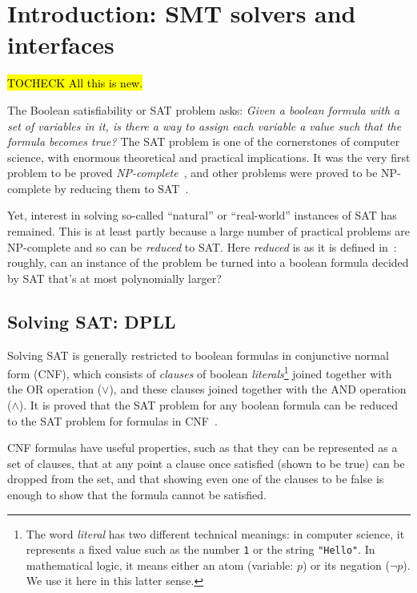 \chapter{Introduction: SMT solvers and interfaces}
\label{chap:intro}

\hl{TOCHECK All this is new.}

The Boolean satisfiability or SAT problem asks: \textit{Given a boolean
formula with a set of variables in it, is there a way to assign each variable
a value such that the formula becomes true?} The SAT problem is one of the
cornerstones of computer science, with enormous theoretical and practical
implications. It was the very first problem to be proved
\textit{NP-complete}~\cite{sat-npcomplete}, and other problems were proved to
be NP-complete by reducing them to SAT~\cite{karp21}.

Yet, interest in solving so-called ``natural'' or ``real-world'' instances of
SAT has remained. This is at least partly because a large number of practical
problems are NP-complete and so can be \textit{reduced} to SAT. Here
\textit{reduced} is as it is defined in~\cite{sat-npcomplete}: roughly, can an
instance of the problem be turned into a boolean formula decided by SAT that's
at most polynomially larger?

\section{Solving SAT: DPLL}

Solving SAT is generally restricted to boolean formulas in conjunctive normal
form (CNF), which consists of \textit{clauses} of boolean
\textit{literals}\footnote{The word \textit{literal} has two different
technical meanings: in computer science, it represents a fixed value such as
the number \texttt{1} or the string \texttt{"Hello"}. In mathematical logic,
it means either an atom (variable: $p$) or its negation ($\neg p$). We use it
here in this latter sense.} joined together with the OR operation ($\vee$),
and these clauses joined together with the AND operation ($\wedge$). It is
proved that the SAT problem for any boolean formula can be reduced to the SAT
problem for formulas in CNF~\cite{karp21}.

CNF formulas have useful properties, such as that they can be represented as a
set of clauses, that at any point a clause once satisfied (shown to be true)
can be dropped from the set, and that showing even one of the clauses to be
false is enough to show that the formula cannot be satisfied.

